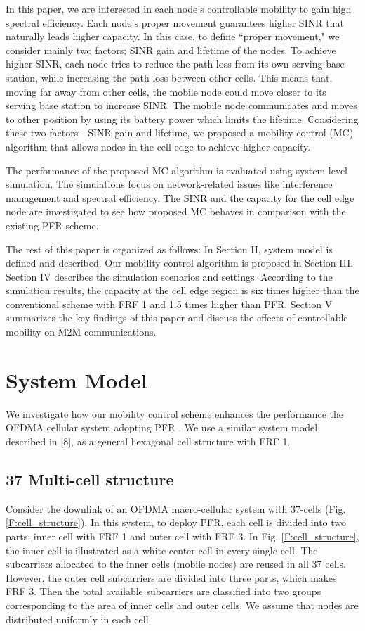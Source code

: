 \documentclass[conference]{IEEEtran}
\begin{document}
In this paper, we are interested in each node's controllable mobility to gain high spectral efficiency. Each node's proper movement guarantees higher SINR that naturally leads higher capacity. In this case, to define ``proper movement," we consider mainly two factors; SINR gain and lifetime of the nodes. To achieve higher SINR, each node tries to reduce the path loss from its own serving base station, while increasing the path loss between other cells. This means that, moving far away from other cells, the mobile node could move closer to its serving base station to increase SINR. The mobile node communicates and moves to other position by using its battery power which limits the lifetime. Considering these two factors - SINR gain and lifetime, we proposed a mobility control (MC) algorithm that allows nodes in the cell edge to achieve higher capacity.

The performance of the proposed MC algorithm is evaluated using system level simulation. The simulations focus on network-related issues like interference management and spectral efficiency. The SINR and the capacity for the cell edge node are investigated to see how proposed MC behaves in comparison with the existing PFR scheme.



 The rest of this paper is organized as follows: In Section II, system model is defined and described. Our mobility control algorithm is proposed in Section III. Section IV describes the simulation scenarios and settings. According to the simulation results, the capacity at the cell edge region is six times higher than the conventional scheme with FRF 1 and 1.5 times higher than PFR. Section V summarizes the key findings of this paper and discuss the effects of controllable mobility on M2M communications.

\section{System Model}

We investigate how our mobility control scheme enhances the performance the OFDMA cellular system adopting PFR \cite{Najjar}. We use a similar system model described in [8], as a general hexagonal cell structure with FRF 1.

\subsection{37 Multi-cell structure}
Consider the downlink of an OFDMA macro-cellular system with 37-cells (Fig. \ref{F:cell_structure}). In this system, to deploy PFR, each cell is divided into two parts; inner cell with FRF 1 and outer cell with FRF 3. In Fig. \ref{F:cell_structure}, the inner cell is illustrated as a white center cell in every single cell. The subcarriers allocated to the inner cells (mobile nodes) are reused in all 37 cells. However, the outer cell subcarriers are divided into three parts, which makes FRF 3. Then the total available subcarriers are classified into two groups corresponding to the area of inner cells and outer cells. We assume that nodes are distributed uniformly in each cell.
\end{document}
